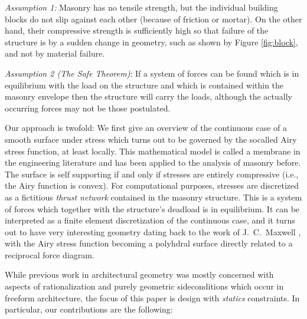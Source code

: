 \documentclass[review]{acmsiggraph}
\begin{document}
{\it Assumption 1:} Masonry has no tensile strength, but the individual 
building blocks do not slip against each other (because of friction or 
mortar). On the other hand, their compressive strength is sufficiently 
high so that failure of the structure is by a sudden change in geometry, 
such as shown by Figure \ref{fig:block}, and not by material failure.

{\it Assumption 2 (The Safe Theorem)}: If a system of forces can be found 
which is in equilibrium with the load on the structure and which is 
contained within the masonry envelope then the structure will carry the 
loads, although the actually occurring forces may not be those postulated.

Our approach is twofold: We first give an overview of the continuous case 
of a smooth surface under stress which turns out to be governed by the 
so\dash called Airy stress function, at least locally. This mathematical 
model is called a membrane in the engineering literature and has been 
applied to the analysis of masonry before. The surface is self\dash 
supporting if and only if stresses are entirely compressive (i.e., the 
Airy function is convex). For computational purposes, stresses are 
discretized as a fictitious {\em thrust network} \cite{Block07} contained 
in the masonry structure. This is a system of forces which together with 
the structure's deadload is in equilibrium. It can be interpreted as a 
finite element discretization of the continuous case, and it turns out to 
have very interesting geometry dating back to the work of J.\ C.\ Maxwell 
, with the Airy stress function becoming a polyhdral 
surface directly related to a reciprocal force diagram. 

While previous work in architectural geometry was mostly concerned
with aspects of rationalization and purely geometric side\dash conditions
which occur in freeform architecture, the focus of this paper is design with
{\em statics} constraints. In particular, our 
contributions are the following:
\end{document}

